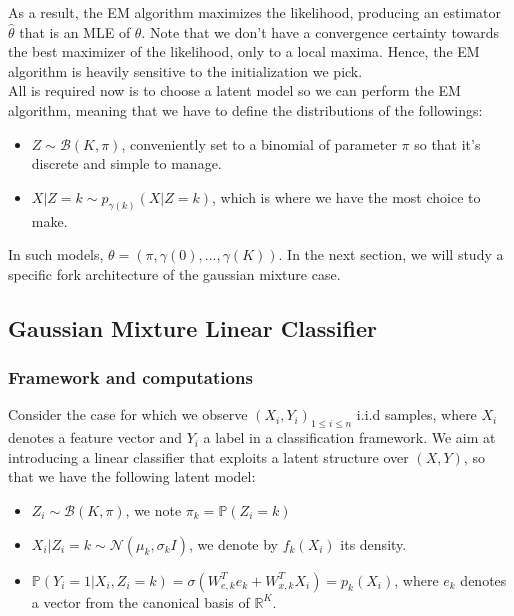 As a result, the EM algorithm maximizes the likelihood, producing an estimator $\widehat{\theta}$ that is an MLE of $\theta$.
Note that we don't have a convergence certainty towards the best maximizer of the likelihood, only to a local maxima.
Hence, the EM algorithm is heavily sensitive to the initialization we pick. \\

All is required now is to choose a latent model so we can perform the EM algorithm, meaning that we have to define the distributions of the followings:
\begin{itemize}
    \item $Z \sim \mathcal{B}(K, \pi)$, conveniently set to a binomial of parameter $\pi$ so that it's discrete and simple to manage.
    \item $X|Z=k \sim p_{\gamma(k)}(X|Z=k)$, which is where we have the most choice to make.
\end{itemize}

In such models, $\theta = (\pi, \gamma(0), ..., \gamma(K))$.
In the next section, we will study a specific fork architecture of the gaussian mixture case.

\subsection{Gaussian Mixture Linear Classifier}

\subsubsection{Framework and computations}
Consider the case for which we observe $(X_i, Y_i)_{1 \leq i \leq n}$ i.i.d samples, where $X_i$ denotes a feature vector and $Y_i$ a label in a classification framework.
We aim at introducing a linear classifier that exploits a latent structure over $(X, Y)$, so that we have the following latent model:
\begin{itemize}
    \item $Z_i \sim \mathcal{B}(K, \pi)$, we note $\pi_k = \mathbb{P}(Z_i = k)$
    \item $X_i|Z_i=k \sim \mathcal{N}(\mu_k, \sigma_k I)$, we denote by $f_k(X_i)$ its density.
    \item $\mathbb{P}(Y_i = 1 | X_i, Z_i=k) = \sigma(W_{e,k}^T e_k + W_{x,k}^T X_i) = p_k(X_i)$, where $e_k$ denotes a vector from the canonical basis of $\mathbb{R}^K$.
\end{itemize}

